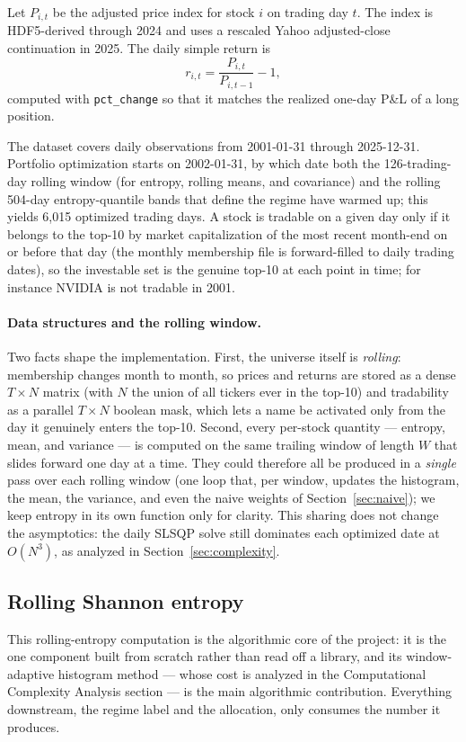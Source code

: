 \documentclass[a4paper,12pt]{article}
\begin{document}
Let $P_{i,t}$ be the adjusted price index for stock $i$ on trading day $t$. The index is HDF5-derived through 2024 and uses a rescaled Yahoo adjusted-close continuation in 2025. The daily simple return is
\[
r_{i,t}=\frac{P_{i,t}}{P_{i,t-1}}-1,
\]
computed with \texttt{pct\_change} so that it matches the realized one-day P\&L of a long position.

The dataset covers daily observations from 2001-01-31 through 2025-12-31. Portfolio optimization starts on 2002-01-31, by which date both the 126-trading-day rolling window (for entropy, rolling means, and covariance) and the rolling 504-day entropy-quantile bands that define the regime have warmed up; this yields 6{,}015 optimized trading days. A stock is tradable on a given day only if it belongs to the top-10 by market capitalization of the most recent month-end on or before that day (the monthly membership file is forward-filled to daily trading dates), so the investable set is the genuine top-10 at each point in time; for instance NVIDIA is not tradable in 2001.

\paragraph{Data structures and the rolling window.} Two facts shape the implementation. First, the universe itself is \emph{rolling}: membership changes month to month, so prices and returns are stored as a dense $T\times N$ matrix (with $N$ the union of all tickers ever in the top-10) and tradability as a parallel $T\times N$ boolean mask, which lets a name be activated only from the day it genuinely enters the top-10. Second, every per-stock quantity --- entropy, mean, and variance --- is computed on the same trailing window of length $W$ that slides forward one day at a time. They could therefore all be produced in a \emph{single} pass over each rolling window (one loop that, per window, updates the histogram, the mean, the variance, and even the naive weights of Section~\ref{sec:naive}); we keep entropy in its own function only for clarity. This sharing does not change the asymptotics: the daily SLSQP solve still dominates each optimized date at $O(N^3)$, as analyzed in Section~\ref{sec:complexity}.

\subsection{Rolling Shannon entropy}

This rolling-entropy computation is the algorithmic core of the project: it is the one component built from scratch rather than read off a library, and its window-adaptive histogram method --- whose cost is analyzed in the Computational Complexity Analysis section --- is the main algorithmic contribution. Everything downstream, the regime label and the allocation, only consumes the number it produces.
\end{document}
